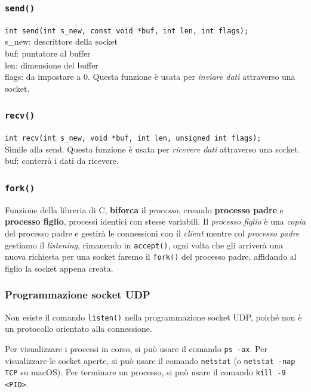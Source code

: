 \subsubsection*{\texttt{send()}}
\texttt{int send(int s\_new, const void *buf, int len, int flags);} \\ 
s\_new: descrittore della socket \\
buf: puntatore al buffer \\
len: dimensione del buffer \\
flags: da impostare a 0. Questa funzione è usata per \textit{inviare dati} attraverso una socket.

\subsubsection*{\texttt{recv()}}
\texttt{int recv(int s\_new, void *buf, int len, unsigned int flags);} \\
Simile alla send. Questa funzione è usata per \textit{ricevere dati} attraverso una socket. \\
buf: conterrà i dati da ricevere.

\subsubsection*{\texttt{fork()}}
Funzione della libreria di C, \textbf{biforca} il \textit{processo}, creando \textbf{processo padre} e \textbf{processo figlio}, processi identici con stesse variabili. Il \textit{processo figlio} è una \textit{copia} del processo padre e gestirà le connessioni con il \textit{client} mentre col \textit{processo padre} gestiamo il \textit{listening}, rimanendo in \texttt{accept()}, ogni volta che gli arriverà una nuova richiesta per una socket faremo il \texttt{fork()} del processo padre, affidando al figlio la socket appena creata.

\subsubsection{Programmazione socket UDP}
Non esiste il comando \texttt{listen()} nella programmazione socket UDP, poiché non è un protocollo orientato alla connessione.

Per visualizzare i processi in corso, si può usare il comando \texttt{ps -ax}. Per visualizzare le socket aperte, si può usare il comando \texttt{netstat} (o \texttt{netstat -nap TCP} su macOS). Per terminare un processo, si può usare il comando \texttt{kill -9 <PID>}.
